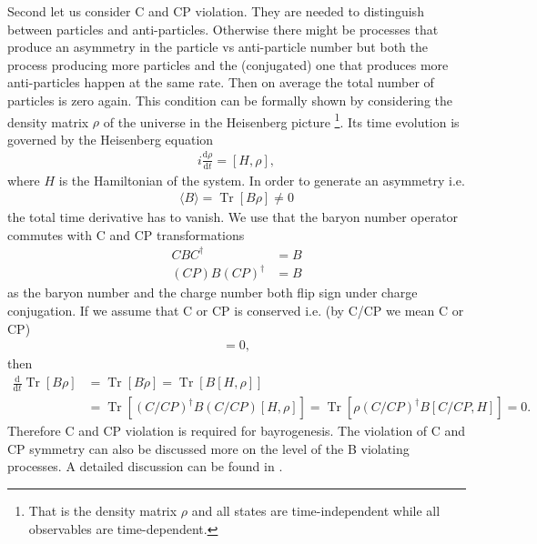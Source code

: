\documentclass[13pt,a4paper,titlepage]{article}
\newcommand{\Tr}{\operatorname{Tr}}
\begin{document}
\noindent
Second let us consider C and CP violation. They are needed to distinguish between particles and anti-particles. Otherwise there might be processes that produce an asymmetry in the
particle vs anti-particle number but both the process producing more particles and the (conjugated) one that produces more anti-particles happen at the same rate.
Then on average the total number of particles is zero again.
This condition can be formally shown by considering the density matrix $\rho$ of the universe in the Heisenberg picture \footnote{That is the density matrix $\rho$ and all states are time-independent while all observables are time-dependent.}. Its time evolution is governed by the Heisenberg equation
\begin{align}
    i \frac{\mathrm{d} \rho}{\mathrm{d} t} = [H, \rho],
\end{align}
where $H$ is the Hamiltonian of the system.
In order to generate an asymmetry i.e.
\begin{align}
    \langle B \rangle = \Tr [ B \rho ] \neq 0
\end{align}
the total time derivative has to vanish.
We use that the baryon number operator commutes with C and CP transformations
\begin{align}
    C B C^\dagger &= B \\
    (C P) B (C P)^\dagger &= B
\end{align}
as the baryon number and the charge number both flip sign under charge conjugation.
If we assume that C or CP is conserved i.e. (by C/CP we mean C or CP)
\begin{align}
[H, C/CP] = 0,
\end{align}
then
\begin{align}
    \frac{\mathrm{d}}{\mathrm{d} t} \Tr [ B \rho ] &= \Tr [ B \dot{\rho} ] = \Tr [ B [H, \rho] ] \\
    &= \Tr [ (C/CP)^\dagger B (C/CP) [H, \rho] ] = \Tr [ \rho (C/CP)^\dagger B [C/CP, H] ] = 0.
\end{align}
Therefore C and CP violation is required for bayrogenesis. The violation of C and CP symmetry can also be discussed more on the level of the B violating processes. A detailed discussion can be found in \cite[sec 2.3]{Cline:2006ts_Baryogenesis}. %
\end{document}
